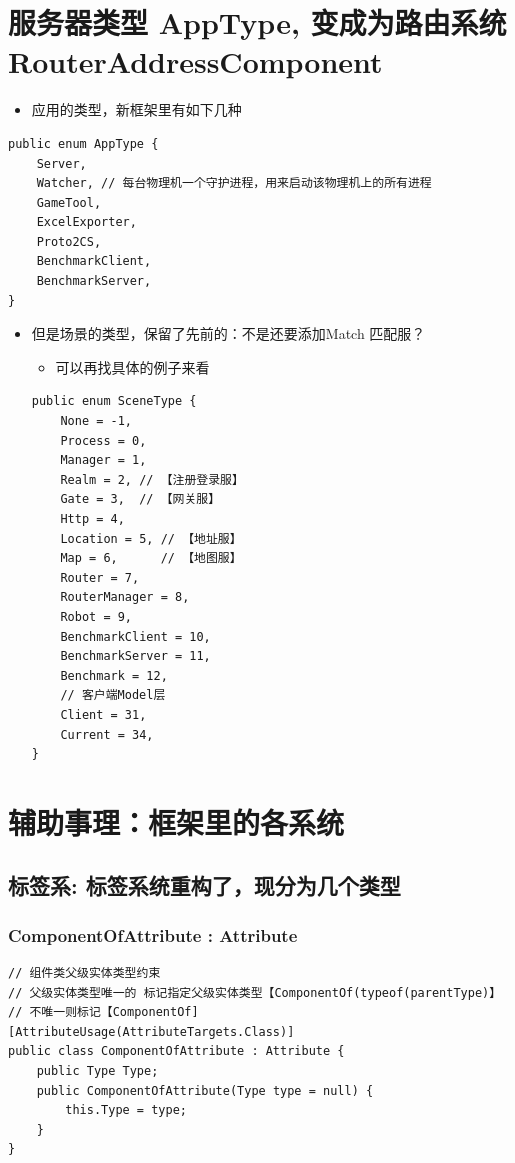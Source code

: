 \documentclass[9pt, b5paper]{article}
\begin{document}
\section{服务器类型 AppType, 变成为路由系统 RouterAddressComponent}
\label{sec:orgf549bbd}
\begin{itemize}
\item 应用的类型，新框架里有如下几种
\end{itemize}
\begin{verbatim}
public enum AppType {
    Server,
    Watcher, // 每台物理机一个守护进程，用来启动该物理机上的所有进程
    GameTool,
    ExcelExporter,
    Proto2CS,
    BenchmarkClient,
    BenchmarkServer,
}
\end{verbatim}
\begin{itemize}
\item 但是场景的类型，保留了先前的：不是还要添加Match 匹配服？
\begin{itemize}
\item 可以再找具体的例子来看
\end{itemize}
\begin{verbatim}
public enum SceneType {
    None = -1,
    Process = 0,
    Manager = 1,
    Realm = 2, // 【注册登录服】
    Gate = 3,  // 【网关服】
    Http = 4,
    Location = 5, // 【地址服】
    Map = 6,      // 【地图服】
    Router = 7,
    RouterManager = 8,
    Robot = 9,
    BenchmarkClient = 10,
    BenchmarkServer = 11,
    Benchmark = 12,
    // 客户端Model层
    Client = 31,
    Current = 34,
}
\end{verbatim}
\end{itemize}
\section{辅助事理：框架里的各系统}
\label{sec:orga552b99}
\subsection{标签系: 标签系统重构了，现分为几个类型}
\label{sec:org3314584}
\subsubsection{ComponentOfAttribute : Attribute}
\label{sec:org8a176b4}
\begin{verbatim}
// 组件类父级实体类型约束
// 父级实体类型唯一的 标记指定父级实体类型【ComponentOf(typeof(parentType)】
// 不唯一则标记【ComponentOf]
[AttributeUsage(AttributeTargets.Class)]
public class ComponentOfAttribute : Attribute {
    public Type Type;
    public ComponentOfAttribute(Type type = null) {
        this.Type = type;
    }
}
\end{verbatim}
\end{document}
